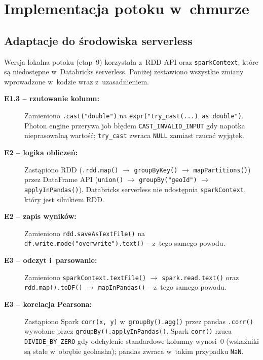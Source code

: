 \documentclass{labreport}
\begin{document}
\section{Implementacja potoku w~chmurze}

\subsection{Adaptacje do środowiska serverless}

Wersja lokalna potoku (etap~9) korzystała z~RDD API oraz \texttt{sparkContext}, które są niedostępne w~Databricks serverless. Poniżej zestawiono wszystkie zmiany wprowadzone w~kodzie wraz z~uzasadnieniem.

\begin{description}
    \item[\textbf{E1.3 -- rzutowanie kolumn:}] Zamieniono \texttt{.cast("double")} na \texttt{expr("try\_cast(...) as double")}. Photon engine przerywa job błędem \texttt{CAST\_INVALID\_INPUT} gdy napotka nieprasowalną wartość; \texttt{try\_cast} zwraca \texttt{NULL} zamiast rzucać wyjątek.

    \item[\textbf{E2 -- logika obliczeń:}] Zastąpiono RDD (\texttt{.rdd.map()} $\rightarrow$ \texttt{groupByKey()} $\rightarrow$ \texttt{mapPartitions()}) przez DataFrame API (\texttt{union()} $\rightarrow$ \texttt{groupBy("geoId")} $\rightarrow$ \texttt{applyInPandas()}). Databricks serverless nie udostępnia \texttt{sparkContext}, który jest silnikiem RDD.

    \item[\textbf{E2 -- zapis wyników:}] Zamieniono \texttt{rdd.saveAsTextFile()} na \texttt{df.write.mode("overwrite").text()} -- z~tego samego powodu.

    \item[\textbf{E3 -- odczyt i~parsowanie:}] Zamieniono \texttt{sparkContext.textFile()} $\rightarrow$ \texttt{spark.read.text()} oraz \texttt{rdd.map().toDF()} $\rightarrow$ \texttt{mapInPandas()} -- z~tego samego powodu.

    \item[\textbf{E3 -- korelacja Pearsona:}] Zastąpiono Spark \texttt{corr(x, y)} w~\texttt{groupBy().agg()} przez pandas \texttt{.corr()} wywołane przez \texttt{groupBy().applyInPandas()}. Spark \texttt{corr()} rzuca \texttt{DIVIDE\_BY\_ZERO} gdy odchylenie standardowe kolumny wynosi~0 (wskaźniki są stałe w~obrębie geohasha); pandas zwraca w~takim przypadku \texttt{NaN}.


\end{description}
\end{document}
